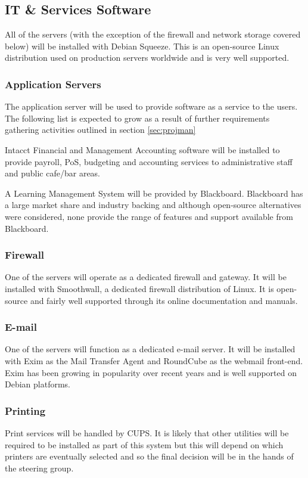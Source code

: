 \documentclass[a4paper, twoside]{article}
\begin{document}
\subsection{IT \& Services Software}
All of the servers (with the exception of the firewall and network storage
covered below) will be installed with Debian Squeeze. This is an open-source
Linux distribution used on production servers worldwide\cite{debian} and is
very well supported.

\subsubsection{Application Servers}
The application server will be used to provide software as a service to the
users. The following list is expected to grow as a result of further
requirements gathering activities outlined in section \ref{sec:projman}

Intacct Financial and Management Accounting software will be installed to
provide payroll, PoS, budgeting and accounting services to administrative staff
and public cafe/bar areas.

A Learning Management System will be provided by Blackboard. Blackboard has a
large market share and industry backing \cite{bb} and although open-source
alternatives were considered, none provide the range of features and support
available from Blackboard.

\subsubsection{Firewall}
One of the servers will operate as a dedicated firewall and gateway. It will be
installed with Smoothwall, a dedicated firewall distribution of Linux. It is
open-source and fairly well supported through its online documentation and
manuals.

\subsubsection{E-mail}
One of the servers will function as a dedicated e-mail server. It will be
installed with Exim as the Mail Transfer Agent and RoundCube as the webmail
front-end. Exim has been growing in popularity over recent years and is well
supported on Debian platforms\cite{exim}.

\subsubsection{Printing}
Print services will be handled by CUPS. It is likely that other utilities will
be required to be installed as part of this system but this will depend on which
printers are eventually selected and so the final decision will be in the hands
of the steering group.
\end{document}
